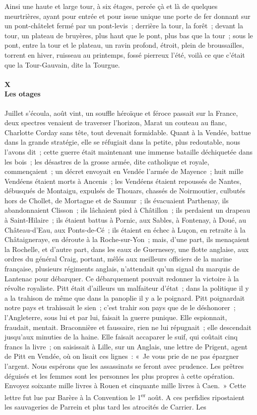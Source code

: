\documentclass[french,twoside]{book} %
\begin{document}
\noindent Ainsi une haute et large tour, à six étages, percée çà et là de quelques meurtrières, ayant pour entrée et pour issue unique une porte de fer donnant sur un pont-châtelet fermé par un pont-levis ; derrière la tour, la forêt ; devant la tour, un plateau de bruyères, plus haut que le pont, plus bas que la tour ; sous le pont, entre la tour et le plateau, un ravin profond, étroit, plein de broussailles, torrent en hiver, ruisseau au printemps, fossé pierreux l’été, voilà ce que c’était que la Tour-Gauvain, dite la Tourgue.
 \paragraph[{X. Les otages}]{X \\
Les otages}
\label{p3l2c10}
\noindent Juillet s’écoula, août vint, un souffle héroïque et féroce passait sur la France, deux spectres venaient de traverser l’horizon, Marat un couteau au flanc, Charlotte Corday sans tête, tout devenait formidable. Quant à la Vendée, battue dans la grande stratégie, elle se réfugiait dans la petite, plus redoutable, nous l’avons dit ; cette guerre était maintenant une immense bataille déchiquetée dans les bois ; les désastres de la grosse armée, dite catholique et royale, commençaient ; un décret envoyait en Vendée l’armée de Mayence ; huit mille Vendéens étaient morts à Ancenis ; les Vendéens étaient repoussés de Nantes, débusqués de Montaigu, expulsés de Thouars, chassés de Noirmoutier, culbutés hors de Chollet, de Mortagne et de Saumur ; ils évacuaient Parthenay, ils abandonnaient Clisson ; ils lâchaient pied à Châtillon ; ils perdaient un drapeau à Saint-Hilaire ; ils étaient battus à Pornic, aux Sables, à Fontenay, à Doué, au Château-d’Eau, aux Ponts-de-Cé ; ils étaient en échec à Luçon, en retraite à la Châtaigneraye, en déroute à la Roche-sur-Yon ; mais, d’une part, ils menaçaient la Rochelle,  et d’autre part, dans les eaux de Guernesey, une flotte anglaise, aux ordres du général Craig, portant, mêlés aux meilleurs officiers de la marine française, plusieurs régiments anglais, n’attendait qu’un signal du marquis de Lantenac pour débarquer. Ce débarquement pouvait redonner la victoire à la révolte royaliste. Pitt était d’ailleurs un malfaiteur d’état ; dans la politique il y a la trahison de même que dans la panoplie il y a le poignard. Pitt poignardait notre pays et trahissait le sien ; c’est trahir son pays que de le déshonorer ; l’Angleterre, sous lui et par lui, faisait la guerre punique. Elle espionnait, fraudait, mentait. Braconnière et faussaire, rien ne lui répugnait ; elle descendait jusqu’aux minuties de la haine. Elle faisait accaparer le suif, qui coûtait cinq francs la livre ; on saisissait à Lille, sur un Anglais, une lettre de Prigent, agent de Pitt en Vendée, où on lisait ces lignes : « Je vous prie de ne pas épargner l’argent. Nous espérons que les assassinats se feront avec prudence. Les prêtres déguisés et les femmes sont les personnes les plus propres à cette opération. Envoyez soixante mille livres à Rouen et cinquante mille livres à Caen. » Cette lettre fut lue par Barère à la Convention le 1\textsuperscript{er} août. A ces perfidies ripostaient les sauvageries de Parrein et plus tard les atrocités de Carrier. Les 
\end{document}
